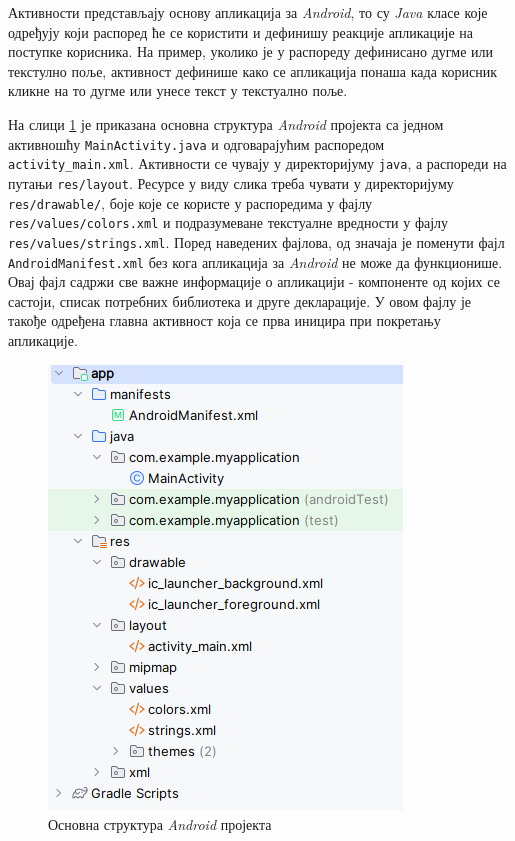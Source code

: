 \documentclass[12pt,oneside]{memoir}
\begin{document}
Активности представљају основу апликација за \textit{Android}, то су \textit{Java} класе које одређују који распоред ће се користити и дефинишу реакције апликације на поступке корисника. На пример, уколико је у распореду дефинисано дугме или текстулно поље, активност дефинише како се апликација понаша када корисник кликне на то дугме или унесе текст у текстуално поље.

На слици \ref{pic:android_app_struct} је приказана основна структура \textit{Android} пројекта са једном активношћу \texttt{MainActivity.java} и одговарајућим распоредом \texttt{activity\_main.xml}. Активности се чувају у директоријуму \texttt{java}, а распореди на путањи \texttt{res/layout}. Ресурсе у виду слика треба чувати у директоријуму \texttt{res/drawable/}, боје које се користе у распоредима у фајлу \texttt{res/values/colors.xml} и подразумеване текстуалне вредности у фајлу \texttt{res/values/strings.xml}. Поред наведених фајлова, од значаја је поменути фајл \texttt{AndroidManifest.xml} без кога апликација за \textit{Android} не може да функционише. Овај фајл садржи све важне информације о апликацији - компоненте од којих се састоји, списак потребних библиотека и друге декларације. У овом фајлу је такође одређена главна активност која се прва иницира при покретању апликације. 

\begin{figure}[H]
  \centering
  \includegraphics[scale=0.56]{assets/pictures/android_app_struct.png}
  \caption{Основна структура \textit{Android} пројекта}
  \label{pic:android_app_struct}
\end{figure}
\end{document}
